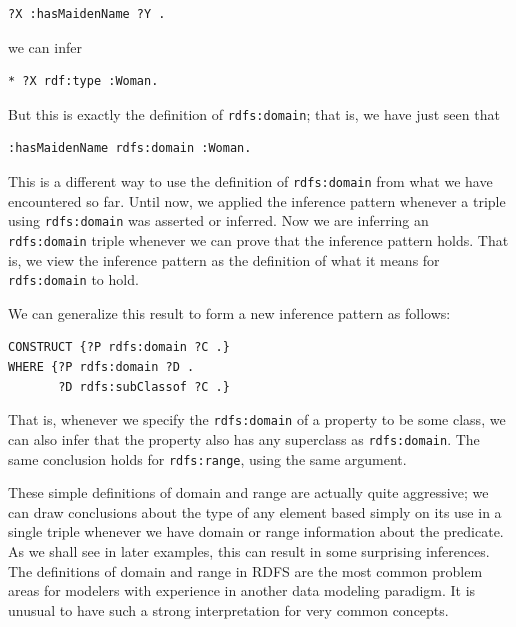 \begin{lstlisting}
?X :hasMaidenName ?Y .
\end{lstlisting}

we can infer

\begin{lstlisting}
* ?X rdf:type :Woman.
\end{lstlisting}

But this is exactly the definition of \texttt{rdfs:domain}; that is, we have just
seen that

\begin{lstlisting}
:hasMaidenName rdfs:domain :Woman.
\end{lstlisting}

This is a different way to use the definition of \texttt{rdfs:domain} from what
we have encountered so far. Until now, we applied the inference pattern
whenever a triple using \texttt{rdfs:domain} was asserted or inferred. Now we are
inferring an \texttt{rdfs:domain} triple whenever we can prove that the inference
pattern holds. That is, we view the inference pattern as the definition
of what it means for \texttt{rdfs:domain} to hold.

We can generalize this result to form a new inference pattern as
follows:

\begin{lstlisting}
CONSTRUCT {?P rdfs:domain ?C .}
WHERE {?P rdfs:domain ?D .
       ?D rdfs:subClassof ?C .}
\end{lstlisting}

That is, whenever we specify the \texttt{rdfs:domain} of a property to be some
class, we can also infer that the property also has any superclass as
\texttt{rdfs:domain}. The same conclusion holds for \texttt{rdfs:range}, using the same
argument.

These simple definitions of domain and range are actually quite
aggressive; we can draw conclusions about the type of any element based
simply on its use in a single triple whenever we have domain or range
information about the predicate. As we shall see in later examples, this
can result in some surprising inferences. The definitions of domain and
range in RDFS are the most common problem areas for modelers with
experience in another data modeling paradigm. It is unusual to have such
a strong interpretation for very common concepts.

